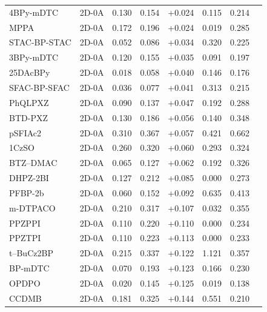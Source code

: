 \begin{longtable}{llcccccc}
4BPy-mDTC & 2D-0A & 0.130 & 0.154 & +0.024 & 0.115 & 0.214 & \cite{doi101039C7TC00457E} \\
MPPA & 2D-0A & 0.172 & 0.196 & +0.024 & 0.019 & 0.285 & \cite{doi101039D2TC03316J} \\
STAC-BP-STAC & 2D-0A & 0.052 & 0.086 & +0.034 & 0.320 & 0.225 & \cite{doi101016jcej2022134934} \\
3BPy-mDTC & 2D-0A & 0.120 & 0.155 & +0.035 & 0.091 & 0.197 & \cite{doi101039C7TC00457E} \\
25DAcBPy & 2D-0A & 0.018 & 0.058 & +0.040 & 0.146 & 0.176 & \cite{doi101039C9TC04536H} \\
SFAC-BP-SFAC & 2D-0A & 0.036 & 0.077 & +0.041 & 0.313 & 0.215 & \cite{doi101016jcej2022134934} \\
PhQLPXZ & 2D-0A & 0.090 & 0.137 & +0.047 & 0.192 & 0.288 & \cite{doi101016jorgel2022106518} \\
BTD-PXZ & 2D-0A & 0.130 & 0.186 & +0.056 & 0.140 & 0.348 & \cite{doi101016jdyepig2023111084} \\
pSFIAc2 & 2D-0A & 0.310 & 0.367 & +0.057 & 0.421 & 0.662 & \cite{doi101039D2SC01543A} \\
1CzSO & 2D-0A & 0.260 & 0.320 & +0.060 & 0.293 & 0.324 & \cite{doi101039C7TC00119C} \\
BTZ--DMAC & 2D-0A & 0.065 & 0.127 & +0.062 & 0.192 & 0.326 & \cite{doi101039C7TC00025A} \\
DHPZ-2BI & 2D-0A & 0.127 & 0.212 & +0.085 & 0.000 & 0.273 & \cite{doi101039C4TC02530J} \\
PFBP-2b & 2D-0A & 0.060 & 0.152 & +0.092 & 0.635 & 0.413 & \cite{doi101039C8TC04867C} \\
m-DTPACO & 2D-0A & 0.210 & 0.317 & +0.107 & 0.032 & 0.355 & \cite{doi101016jdyepig201610029} \\
PPZPPI & 2D-0A & 0.110 & 0.220 & +0.110 & 0.000 & 0.234 & \cite{doi101039C7TC05576E} \\
PPZTPI & 2D-0A & 0.110 & 0.223 & +0.113 & 0.000 & 0.233 & \cite{doi101039C7TC05576E} \\
t--BuCz2BP & 2D-0A & 0.215 & 0.337 & +0.122 & 1.121 & 0.357 & \cite{doi101016jdyepig201606025} \\
BP-mDTC & 2D-0A & 0.070 & 0.193 & +0.123 & 0.166 & 0.230 & \cite{doi101039C7TC00457E} \\
OPDPO & 2D-0A & 0.020 & 0.145 & +0.125 & 0.019 & 0.138 & \cite{doi101039C8QM00064F} \\
CCDMB & 2D-0A & 0.181 & 0.325 & +0.144 & 0.551 & 0.210 & \cite{doi101016jorgel2021106187} \\

\end{longtable}
